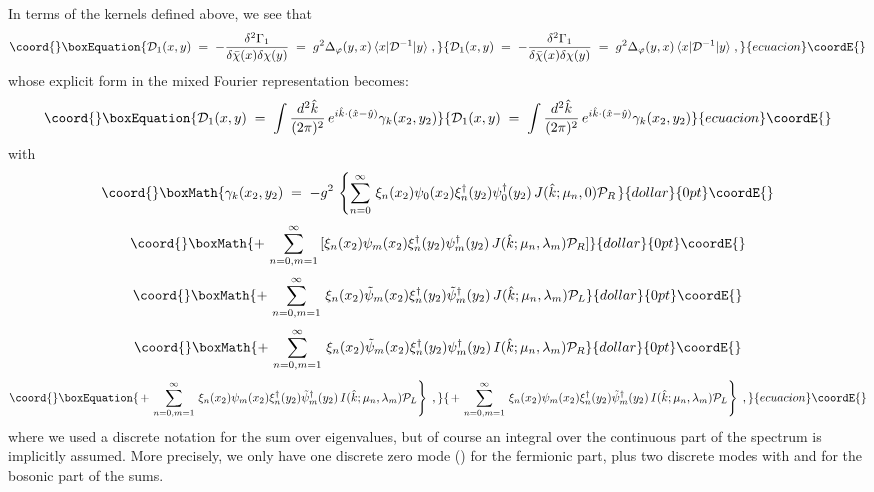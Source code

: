 \documentclass[a4paper,12pt]{article}
\begin{document}
In terms of the kernels defined above, we see that
\begin{equation}\coord{}\boxEquation{
 \label{eq:ddg1}
{\mathcal D}_1(x,y) \;=\; -
\frac{\delta^2 \Gamma_1}{\delta{\bar\chi}(x)\delta\chi(y)}\;=\; 
g^2 \Delta_\varphi(y,x) \, \langle x|{\mathcal D}^{-1}|y\rangle \;,  
}{
 {\mathcal D}_1(x,y) \;=\; -
\frac{\delta^2 \Gamma_1}{\delta{\bar\chi}(x)\delta\chi(y)}\;=\; 
g^2 \Delta_\varphi(y,x) \, \langle x|{\mathcal D}^{-1}|y\rangle \;,  
}{ecuacion}\coordE{}\end{equation}
whose explicit form in the mixed Fourier representation becomes:
\begin{equation}\coord{}\boxEquation{
{\mathcal D}_1(x,y)\;=\;\int\frac{d^2{\hat k}}{(2\pi)^2} \,
e^{i {\hat k} \cdot ({\hat x} - {\hat y})} \gamma_k (x_2,y_2) 
}{
{\mathcal D}_1(x,y)\;=\;\int\frac{d^2{\hat k}}{(2\pi)^2} \,
e^{i {\hat k} \cdot ({\hat x} - {\hat y})} \gamma_k (x_2,y_2) 
}{ecuacion}\coordE{}\end{equation}
with
$$\coord{}\boxMath{
\gamma_k (x_2,y_2) \;=\; - g^2 \, \left\{
 \sum_{n=0}^\infty \,
 \xi_n(x_2) \psi_0(x_2) \xi^\dagger_n(y_2) \psi^\dagger_0(y_2) \,
  J({\hat k};\mu_n,0) {\mathcal P}_R \right.
}{dollar}{0pt}\coordE{}$$  $$\coord{}\boxMath{
+\,\sum_{n=0,m=1}^\infty\,[\xi_n(x_2)\psi_m(x_2)\xi^\dagger_n(y_2) 
\psi^\dagger_m(y_2) \, J({\hat k};\mu_n,\lambda_m) {\mathcal P}_R ] 
}{dollar}{0pt}\coordE{}$$  $$\coord{}\boxMath{
+\,\sum_{n=0, m=1}^\infty \, \xi_n(x_2) {\tilde\psi}_m(x_2) \xi^\dagger_n(y_2) 
{\tilde\psi}^\dagger_m(y_2) \, J({\hat k};\mu_n,\lambda_m) {\mathcal P}_L  
}{dollar}{0pt}\coordE{}$$  $$\coord{}\boxMath{
+ \, \sum_{n=0, m=1}^\infty \, \xi_n(x_2) {\tilde\psi}_m(x_2) \xi^\dagger_n(y_2) 
\psi^\dagger_m(y_2) \, I({\hat k};\mu_n,\lambda_m) {\mathcal P}_R  
}{dollar}{0pt}\coordE{}$$
\begin{equation}\coord{}\boxEquation{
  \label{eq:gammak}
\left. + \, \sum_{n=0, m=1}^\infty \, \xi_n(x_2) \psi_m(x_2) \xi^\dagger_n(y_2) 
{\tilde\psi}^\dagger_m(y_2) \, I({\hat k};\mu_n,\lambda_m) {\mathcal P}_L \right\} \;,
}{
  \left. + \, \sum_{n=0, m=1}^\infty \, \xi_n(x_2) \psi_m(x_2) \xi^\dagger_n(y_2) 
{\tilde\psi}^\dagger_m(y_2) \, I({\hat k};\mu_n,\lambda_m) {\mathcal P}_L \right\} \;,
}{ecuacion}\coordE{}\end{equation}
where we used a discrete notation for the sum over eigenvalues, but
of course an integral over the continuous part of the spectrum is
implicitly assumed. More precisely, we only have one discrete zero 
mode (\coordHE{}) for the fermionic part, plus two discrete modes with
\coordHE{} and \coordHE{} for the bosonic part of the sums. 
\end{document}
